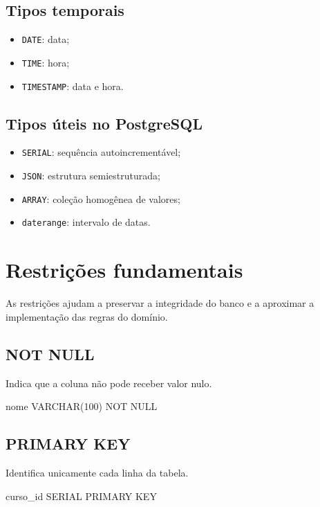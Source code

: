 \subsection{Tipos temporais}

\begin{itemize}
    \item \texttt{DATE}: data;
    \item \texttt{TIME}: hora;
    \item \texttt{TIMESTAMP}: data e hora.
\end{itemize}

\subsection{Tipos úteis no PostgreSQL}

\begin{itemize}
    \item \texttt{SERIAL}: sequência autoincrementável;
    \item \texttt{JSON}: estrutura semiestruturada;
    \item \texttt{ARRAY}: coleção homogênea de valores;
    \item \texttt{daterange}: intervalo de datas.
\end{itemize}

\section{Restrições fundamentais}

As restrições ajudam a preservar a integridade do banco e a aproximar a implementação das regras do domínio.

\subsection{NOT NULL}

Indica que a coluna não pode receber valor nulo.

\begin{sqlcode}
nome VARCHAR(100) NOT NULL
\end{sqlcode}

\subsection{PRIMARY KEY}

Identifica unicamente cada linha da tabela.

\begin{sqlcode}
curso_id SERIAL PRIMARY KEY
\end{sqlcode}

